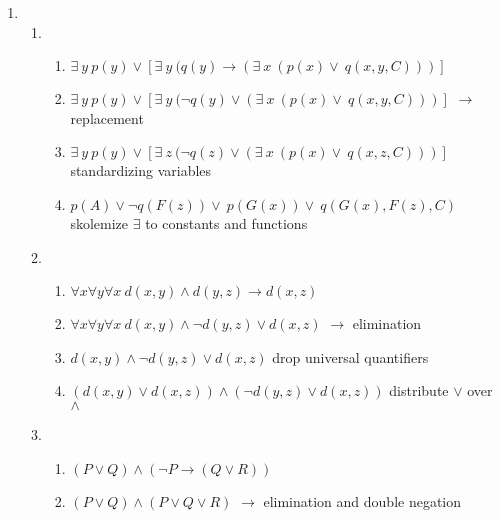 \documentclass{article}
\begin{document}
\begin{enumerate}
    \item %
    \begin{enumerate}
        \item %
        \begin{enumerate}
            \item $\exists\ y\ p(y) \vee [\exists\ y\ (q(y) \rightarrow (\exists\ x\ (p(x) \vee\ q(x,y,C)))]$
            \item $\exists\ y\ p(y) \vee [\exists\ y\ (\neg q(y) \vee (\exists\ x\ (p(x) \vee\ q(x,y,C)))]$ $\rightarrow$ replacement
            \item $\exists\ y\ p(y) \vee [\exists\ z\ (\neg q(z) \vee (\exists\ x\ (p(x) \vee\ q(x,z,C)))]$ standardizing variables
            \item $p(A) \vee \neg q(F(z)) \vee\ p(G(x)) \vee\ q(G(x),F(z),C)$ skolemize $\exists$ to constants and functions\\
        \end{enumerate}

        \item %
        \begin{enumerate}
            \item $\forall x \forall y \forall x\ d(x,y) \wedge d(y,z) \rightarrow d(x,z)$
            \item $\forall x \forall y \forall x\ d(x,y) \wedge \neg d(y,z) \vee d(x,z)$ $\rightarrow$ elimination
            \item $d(x,y) \wedge \neg d(y,z) \vee d(x,z)$ drop universal quantifiers
            \item $(d(x,y) \vee d(x,z)) \wedge (\neg d(y,z) \vee d(x,z))$ distribute $\vee$ over $\wedge$\\
        \end{enumerate}

        \item %
        \begin{enumerate}
            \item $( P \vee Q) \wedge (\neg P \rightarrow (Q \vee R))$
            \item $( P \vee Q) \wedge (P \vee Q \vee R)$ $\rightarrow$ elimination and double negation
        \end{enumerate}


    \end{enumerate}


\end{enumerate}
\end{document}

